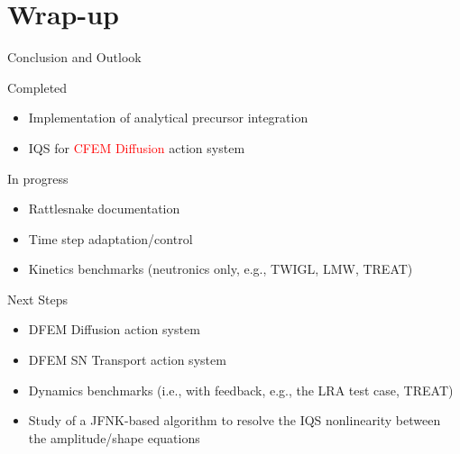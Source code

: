 \documentclass[8pt]{beamer}
\newcommand{\bi}{\begin{itemize}}
\newcommand{\ei}{\end{itemize}}
\newcommand{\tcr}[1]{\textcolor{red}{#1}}
\begin{document}

%
%


%


\section{Wrap-up}

\begin{frame}{Conclusion and Outlook}

\begin{block}{Completed}
\bi
\item Implementation of analytical precursor integration
\item IQS for \tcr{CFEM Diffusion} action system
\ei
\end{block}

\begin{block}{In progress}
\bi
\item Rattlesnake documentation
\item Time step adaptation/control
\item Kinetics benchmarks (neutronics only, e.g., TWIGL, LMW, TREAT)
\ei
\end{block}
\begin{block}{Next Steps}
\bi
\item DFEM Diffusion action system
\item DFEM SN Transport action system
\item Dynamics benchmarks (i.e., with feedback, e.g., the LRA test case, TREAT)
\item Study of a JFNK-based algorithm to resolve the IQS nonlinearity between the amplitude/shape equations
\ei
\end{block}

\end{frame}
\end{document}
